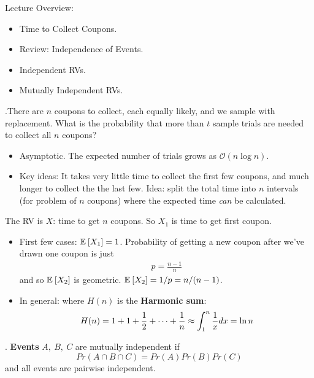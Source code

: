 \documentclass[12pt]{article}
\newcommand{\myspace}{\vspace{2\bigskipamount}}
\newcommand\p{\Needspace{12\baselineskip} \noindent}
\begin{document}
\p Lecture Overview:
\begin{itemize}
	\item Time to Collect Coupons.
	\item Review: Independence of Events.
	\item Independent RVs. 
	\item Mutually Independent RVs. 
\end{itemize}

\p {}.There are $n$ coupons to collect, each equally likely, and we sample with replacement. What is the probability that more than $t$ sample trials are needed to collect all $n$ coupons?
\begin{itemize}
	\item Asymptotic. The expected  number of trials grows as $\mathcal{O}(n\log n)$. 
	\item Key ideas: It takes very little time to collect the first few coupons, and much longer to collect the the last few. Idea: split the total time into $n$ intervals (for problem of $n$ coupons) where the expected time \textit{can} be calculated. 
\end{itemize}

The RV is $X$: time to get $n$ coupons. So $X_1$ is time to get first coupon. 
\begin{itemize}
	\item First few cases: $\mathbb{E}_{}\left[X_1\right] = 1$. Probability of getting a new coupon after we've drawn one coupon is just 
	\begin{align}
		p = \frac{n - 1}{n}
	\end{align}
	and so $\mathbb{E}_{}\left[X_2\right]$ is geometric. $\mathbb{E}_{}\left[X_2\right] = 1/p = n/(n-1)$. 
	
	\item In general:
	where $H(n)$ is the \textbf{Harmonic sum}:
	\begin{align}
		H(n) = 1 + 1 + \frac{1}{2} + \cdots + \frac{1}{n} \approx \int_1^n \frac{1}{x} dx = \ln n
	\end{align}
\end{itemize}

\myspace
\p {}. \textbf{Events} $A,~ B, ~ C$ are mutually independent if $$Pr(A\cap B \cap C) = Pr(A) Pr(B) Pr(C) $$ and all events are pairwise independent. 
\end{document}
